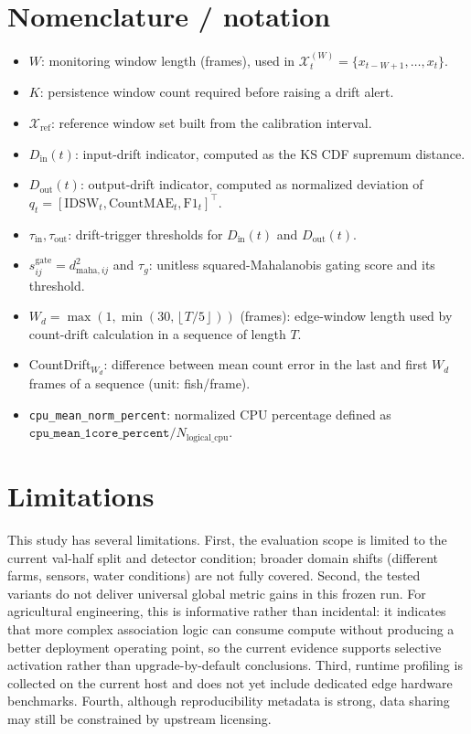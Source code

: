\documentclass[5p,twocolumn,a4paper]{elsarticle}
\begin{document}
\section*{Nomenclature / notation}
\begin{itemize}
  \item $W$: monitoring window length (frames), used in $\mathcal{X}_t^{(W)}=\{x_{t-W+1},\ldots,x_t\}$.
  \item $K$: persistence window count required before raising a drift alert.
  \item $\mathcal{X}_{\mathrm{ref}}$: reference window set built from the calibration interval.
  \item $D_{\mathrm{in}}(t)$: input-drift indicator, computed as the \textsc{KS} \textsc{CDF} supremum distance.
  \item $D_{\mathrm{out}}(t)$: output-drift indicator, computed as normalized deviation of $q_t=[\mathrm{IDSW}_t,\mathrm{CountMAE}_t,\mathrm{F1}_t]^\top$.
  \item $\tau_{\mathrm{in}}, \tau_{\mathrm{out}}$: drift-trigger thresholds for $D_{\mathrm{in}}(t)$ and $D_{\mathrm{out}}(t)$.
  \item $s^{\mathrm{gate}}_{ij}=d^2_{\mathrm{maha},ij}$ and $\tau_g$: unitless squared-Mahalanobis gating score and its threshold.
  \item $W_d=\max\!\left(1,\min\!\left(30,\left\lfloor T/5 \right\rfloor\right)\right)$ (frames): edge-window length used by count-drift calculation in a sequence of length $T$.
  \item CountDrift$_{W_d}$: difference between mean count error in the last and first $W_d$ frames of a sequence (unit: fish/frame).
  \item \texttt{cpu\_mean\_norm\_percent}: normalized CPU percentage defined as $\texttt{cpu\_mean\_1core\_percent}/N_{\mathrm{logical\_cpu}}$.
\end{itemize}

\section{Limitations}
This study has several limitations. First, the evaluation scope is limited to the current val-half split and detector condition; broader domain shifts (different farms, sensors, water conditions) are not fully covered. Second, the tested variants do not deliver universal global metric gains in this frozen run. For agricultural engineering, this is informative rather than incidental: it indicates that more complex association logic can consume compute without producing a better deployment operating point, so the current evidence supports selective activation rather than upgrade-by-default conclusions. Third, runtime profiling is collected on the current host and does not yet include dedicated edge hardware benchmarks. Fourth, although reproducibility metadata is strong, data sharing may still be constrained by upstream licensing.
\end{document}
